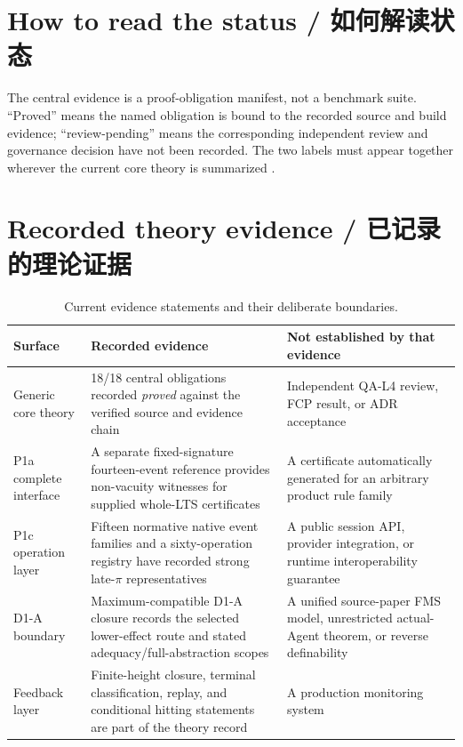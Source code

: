 \label{ch:evaluation}

\section{How to read the status / 如何解读状态}

The central evidence is a proof-obligation manifest, not a benchmark suite. “Proved” means the
named obligation is bound to the recorded source and build evidence; “review-pending” means the
corresponding independent review and governance decision have not been recorded. The two labels
must appear together wherever the current core theory is summarized \citep{cantiluneClosure,cantiluneManifest}.

\section{Recorded theory evidence / 已记录的理论证据}

\begin{table}[H]
\centering
\caption{Current evidence statements and their deliberate boundaries.}
\label{tab:headline-results}
\begin{tabularx}{\textwidth}{@{}L{0.22\textwidth}L{0.23\textwidth}Y@{}}
\toprule
{}
\textbf{Surface} & \textbf{Recorded evidence} & \textbf{Not established by that evidence} \\
\midrule
Generic core theory & 18/18 central obligations recorded \emph{proved} against the verified source and evidence chain & Independent QA-L4 review, FCP result, or ADR acceptance \\
P1a complete interface & A separate fixed-signature fourteen-event reference provides non-vacuity witnesses for supplied whole-LTS certificates & A certificate automatically generated for an arbitrary product rule family \\
P1c operation layer & Fifteen normative native event families and a sixty-operation registry have recorded strong late-\(\pi\) representatives & A public session API, provider integration, or runtime interoperability guarantee \\
D1-A boundary & Maximum-compatible D1-A closure records the selected lower-effect route and stated adequacy/full-abstraction scopes & A unified source-paper FMS model, unrestricted actual-Agent theorem, or reverse definability \\
Feedback layer & Finite-height closure, terminal classification, replay, and conditional hitting statements are part of the theory record & A production monitoring system \\
\bottomrule
\end{tabularx}
\end{table}

